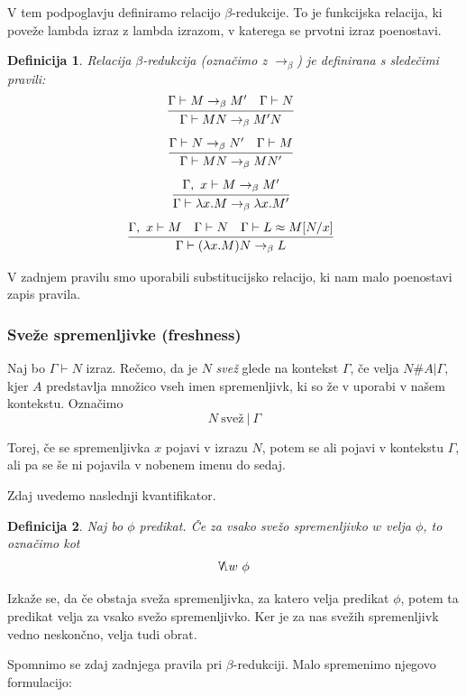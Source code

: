 \documentclass{article}
\newcommand{\inference}[3][]{\infer[#1]{#3}{#2}}
\newtheorem{definicija}{Definicija}
\begin{document}
V tem podpoglavju definiramo relacijo \(\beta\)-redukcije. To je funkcijska relacija, ki poveže lambda izraz z lambda izrazom, v katerega se prvotni izraz poenostavi.

\begin{definicija}
    Relacija \(\beta\)-redukcija (označimo z \(\rightarrow_\beta\)) je definirana s sledečimi pravili:
    \[
        \inference{\Gamma \vdash M \rightarrow_\beta M' \quad \Gamma \vdash N}{\Gamma \vdash MN \rightarrow_\beta M'N}
    \]
    \[
        \inference{\Gamma \vdash N \rightarrow_\beta N' \quad \Gamma \vdash M}{\Gamma \vdash MN \rightarrow_\beta MN'}
    \]
    \[
        \inference{\Gamma,\ x \vdash M \rightarrow_\beta M'}{\Gamma \vdash \lambda x.M \rightarrow_\beta \lambda x.M'}
    \]
    \[
        \inference{\Gamma,\ x \vdash M \quad \Gamma \vdash N \quad \Gamma \vdash L \approx M[N/x]}{\Gamma \vdash (\lambda x.M)N \rightarrow_\beta L}
    \]
\end{definicija}

V zadnjem pravilu smo uporabili substitucijsko relacijo, ki nam malo poenostavi zapis pravila.

\subsubsection{Sveže spremenljivke (freshness)}
Naj bo \(\Gamma \vdash N\) izraz. Rečemo, da je \(N\) \emph{svež} glede na kontekst \(\Gamma\), če velja \(N \# A | \Gamma\), kjer \(A\) predstavlja množico vseh imen spremenljivk, ki so že v uporabi v našem kontekstu. Označimo
\[
    N\ \text{svež}\ |\ \Gamma
\]

Torej, če se spremenljivka \(x\) pojavi v izrazu \(N\), potem se ali pojavi v kontekstu \(\Gamma\), ali pa se še ni pojavila v nobenem imenu do sedaj.

Zdaj uvedemo naslednji kvantifikator.

\begin{definicija}
    Naj bo \(\phi\) predikat. Če za vsako svežo spremenljivko \(w\) velja \(\phi\), to označimo kot
    \[
        \reflectbox{\(\mathsf{\emph{N}}\)}w\ \phi
    \]
\end{definicija}

Izkaže se, da če obstaja sveža spremenljivka, za katero velja predikat \(\phi\), potem ta predikat velja za vsako svežo spremenljivko. Ker je za nas svežih spremenljivk vedno neskončno, velja tudi obrat.


Spomnimo se zdaj zadnjega pravila pri \(\beta\)-redukciji. Malo spremenimo njegovo formulacijo:
\end{document}
